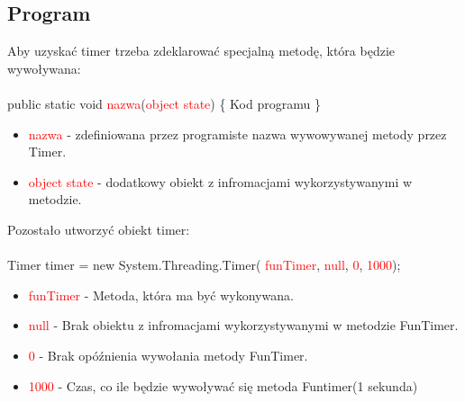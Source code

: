 \documentclass{article}
\begin{document}
\subsection{Program}
Aby uzyskać timer trzeba zdeklarować specjalną metodę, która będzie wywoływana:\\\\
 public static void  \textcolor{red}{nazwa}(\textcolor{red}{object state})
\{
Kod programu
\}
\begin{itemize}
\item \textcolor{red}{nazwa} - zdefiniowana przez programiste nazwa wywowywanej metody przez Timer.
\item \textcolor{red}{object state} - dodatkowy obiekt z infromacjami wykorzystywanymi w metodzie.
\end{itemize}
Pozostało utworzyć obiekt timer:\\\\
Timer timer = new System.Threading.Timer(\space \textcolor{red}{ funTimer},\space \textcolor{red}{ null},\space \textcolor{red}{ 0},\space \textcolor{red}{ 1000});
\begin{itemize}
\item \textcolor{red}{funTimer} - Metoda, która ma być wykonywana.
\item \textcolor{red}{null} - Brak obiektu z infromacjami wykorzystywanymi w metodzie FunTimer.
\item \textcolor{red}{0} - Brak opóźnienia wywołania metody FunTimer.
\item \textcolor{red}{1000} - Czas, co ile będzie wywoływać się metoda Funtimer(1 sekunda)
\end{itemize}
\end{document}

